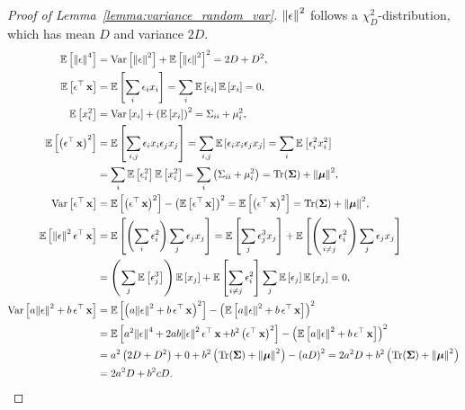\begin{proof}[Proof of Lemma~\ref{lemma:variance_random_var}]
$\norm{\bepsilon}^{2}$ follows a $\chi^{2}_{D}$-distribution, which has mean $D$ and variance $2D$.
\begin{align}
\E\left[\norm{\bepsilon}^{4}\right] &= \text{Var}\left[\norm{\bepsilon}^{2}\right] + \E\left[\norm{\bepsilon}^{2}\right]^{2} = 2D+D^{2},\\
\E\left[\bepsilon^{\top}\bx\right] &= \E\left[\sum_{i}\epsilon_{i}x_{i}\right] = \sum_{i}\E\left[\epsilon_{i}\right]\E\left[x_{i}\right]=0,\\
\E\left[x_{i}^{2}\right] &= \text{Var}\left[x_{i}\right]+\left(\E\left[x_{i}\right]\right)^{2}=\Sigma_{ii}+\mu_{i}^{2},\\
\E\left[\left(\bepsilon^{\top}\bx\right)^{2}\right] &= \E\left[\sum_{i,j}\epsilon_{i}x_{i}\epsilon_{j}x_{j}\right] = \sum_{i,j}\E\left[\epsilon_{i}x_{i}\epsilon_{j}x_{j}\right]= \sum_{i}\E\left[\epsilon_{i}^{2}x_{i}^{2}\right]\\
&= \sum_{i}\E\left[\epsilon_{i}^{2}\right]\E\left[x_{i}^{2}\right] = \sum_{i}\left(\Sigma_{ii}+\mu_{i}^{2}\right) = \text{Tr}(\bSigma) + \norm{\bmu}^{2},\\
\text{Var}\left[\bepsilon^{\top}\bx\right] &= \E\left[\left(\bepsilon^{\top}\bx\right)^{2}\right] - \left(\E\left[\bepsilon^{\top}\bx\right]\right)^{2}=\E\left[\left(\bepsilon^{\top}\bx\right)^{2}\right] = \text{Tr}(\bSigma) + \norm{\bmu}^{2},\\
\E\left[\norm{\bepsilon}^{2}\bepsilon^{\top}\bx\right] &= \E\left[\left(\sum_{i}\epsilon_{i}^{2}\right)\sum_{j}\epsilon_{j}x_{j}\right] = \E\left[\sum_{j}\epsilon_{j}^{3}x_{j}\right] + \E\left[\left(\sum_{i\neq j} \epsilon_{i}^{2}\right)\sum_{j}\epsilon_{j}x_{j}\right]\\
&= \left(\sum_{j}\E\left[\epsilon_{j}^{3}\right]\right)\E\left[x_{j}\right] + \E\left[\sum_{i\neq j} \epsilon_{i}^{2}\right]\sum_{j}\E\left[\epsilon_{j}\right]\E\left[x_{j}\right]=0,\\
\text{Var}\left[a\norm{\bepsilon}^{2} + b\bepsilon^{\top}\bx\right] &= \E\left[\left(a\norm{\bepsilon}^{2} + b\bepsilon^{\top}\bx\right)^{2}\right] - \left(\E\left[a\norm{\bepsilon}^{2} + b\bepsilon^{\top}\bx\right]\right)^{2}\\
&= \E\left[a^{2}\norm{\bepsilon}^{4} + 2ab\norm{\bepsilon}^{2}\bepsilon^{\top}\bx + b^{2}\left(\bepsilon^{\top}\bx\right)^{2}\right] - \left(\E\left[a\norm{\bepsilon}^{2} + b\bepsilon^{\top}\bx\right]\right)^{2}\\
&= a^{2}\left(2D+D^{2}\right) + 0 +b^{2}\left(\text{Tr}(\bSigma)+\norm{\bmu}^{2}\right) - \left(aD\right)^{2} = 2a^{2}D + b^{2}\left(\text{Tr}(\bSigma)+\norm{\bmu}^{2}\right)\\
&= 2a^{2}D + b^{2}cD.
\end{align}
\end{proof}


